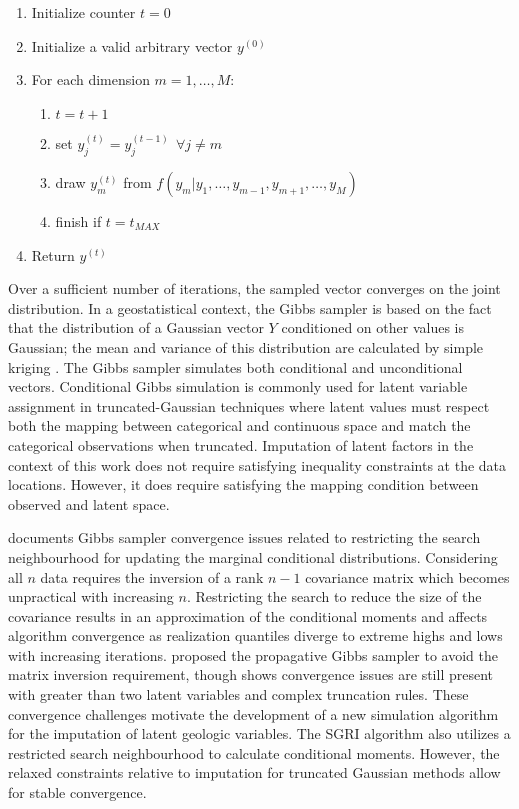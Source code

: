 \begin{enumerate}[noitemsep]
    \item Initialize counter $t=0$
    \item Initialize a valid arbitrary vector $y^{(0)}$
    \item For each dimension $m=1,\dots,M$:
          \begin{enumerate}[noitemsep]
              \item $t=t+1$
              \item set $y^{(t)}_{j} = y^{(t-1)}_{j} \ \ \forall j \neq m$
              \item draw $y^{(t)}_{m}$ from  $f(y_{m}|y_{1},\dots,y_{m-1},y_{m+1},\dots,y_{M})$
              \item finish if $t=t_{MAX}$
          \end{enumerate}
    \item Return $y^{(t)}$
\end{enumerate}

Over a sufficient number of iterations, the sampled vector converges on the joint distribution. In a geostatistical context, the Gibbs sampler is based on the fact that the distribution of a Gaussian vector $Y$ conditioned on other values is Gaussian; the mean and variance of this distribution are calculated by simple kriging \citep{emery2014simulating}. The Gibbs sampler simulates both conditional and unconditional vectors. Conditional Gibbs simulation is commonly used for latent variable assignment in truncated-Gaussian techniques \citep{armstrong2011plurigaussian,silva2017multiple} where latent values must respect both the mapping between categorical and continuous space and match the categorical observations when truncated. Imputation of latent factors in the context of this work does not require satisfying inequality constraints at the data locations. However, it does require satisfying the mapping condition between observed and latent space.

\cite{silva2018enhanced} documents Gibbs sampler convergence issues related to restricting the search neighbourhood for updating the marginal conditional distributions. Considering all $n$ data requires the inversion of a rank $n-1$ covariance matrix which becomes unpractical with increasing $n$. Restricting the search to reduce the size of the covariance results in an approximation of the conditional moments and affects algorithm convergence \citep{emery2014simulating, lauzon2020sequential} as realization quantiles diverge to extreme highs and lows with increasing iterations. \cite{lantuejoul2012simulation} proposed the propagative Gibbs sampler to avoid the matrix inversion requirement, though \cite{silva2018enhanced} shows convergence issues are still present with greater than two latent variables and complex truncation rules. These convergence challenges motivate the development of a new simulation algorithm for the imputation of latent geologic variables. The \gls{SGRI} algorithm also utilizes a restricted search neighbourhood to calculate conditional moments. However, the relaxed constraints relative to imputation for truncated Gaussian methods allow for stable convergence.


